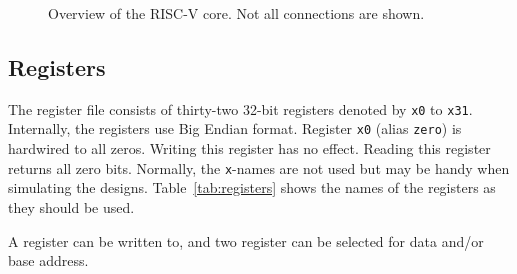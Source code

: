 \documentclass[12pt]{article}
\begin{document}
\begin{figure}
\caption{Overview of the RISC-V core. Not all connections are shown.}
\label{fig:blockdiagram}
\end{figure}

\subsection{Registers}
The register file consists of thirty-two 32-bit registers denoted by \texttt{x0} to \texttt{x31}. Internally, the registers use Big Endian format. Register \texttt{x0} (alias \texttt{zero}) is hardwired to all zeros. Writing this register has no effect. Reading this register returns all zero bits. Normally, the \texttt{x}-names are not used but may be handy when simulating the designs. Table~\ref{tab:registers} shows the names of the registers as they should be used.

A register can be written to, and two register can be selected for data and/or base address.
\end{document}
